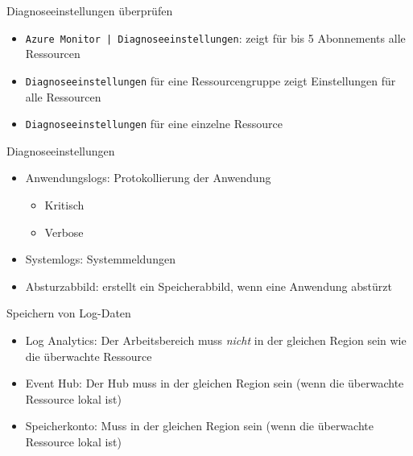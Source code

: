 

\begin{flashcard}[Definition]{Diagnoseeinstellungen überprüfen}
    \begin{itemize}
        \item \texttt{Azure Monitor | Diagnoseeinstellungen}: zeigt für bis 5 Abonnements alle Ressourcen
        \item \texttt{Diagnoseeinstellungen} für eine Ressourcengruppe zeigt Einstellungen für alle Ressourcen
         \item \texttt{Diagnoseeinstellungen} für eine einzelne Ressource
    \end{itemize}
\end{flashcard}

\begin{flashcard}[Definition]{Diagnoseeinstellungen}
    \begin{itemize}
        \item Anwendungslogs: Protokollierung der Anwendung
            \begin{itemize}
                \item Kritisch
                \item Verbose
            \end{itemize}
        \item Systemlogs: Systemmeldungen
        \item Absturzabbild: erstellt ein Speicherabbild, wenn eine Anwendung abstürzt
    \end{itemize}
\end{flashcard}

\begin{flashcard}[Definition]{Speichern von Log-Daten}
    \begin{itemize}
        \item Log Analytics:\newline
            Der Arbeitsbereich muss \emph{nicht} in der gleichen Region sein wie die überwachte Ressource
        \item Event Hub:\newline
            Der Hub muss in der gleichen Region sein (wenn die überwachte Ressource lokal ist)
        \item Speicherkonto:\newline
            Muss in der gleichen Region sein (wenn die überwachte Ressource lokal ist)
    \end{itemize}
\end{flashcard}

